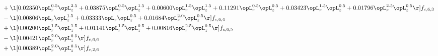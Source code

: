 \begin{alignat}{2}
& + \l[  0.02350 \opL_r^{0.5} \opL_z^{2.5} +  0.03875 \opL_r^{0.5} \opL_z^{1.5} +  0.00600 \opL_r^{1.5} \opL_z^{1.5} +  0.11291 \opL_r^{0.5} \opL_z^{0.5} +  0.03423 \opL_r^{1.5} \opL_z^{0.5} +  0.01796 \opL_r^{2.5} \opL_z^{0.5}  \r] f_{c,6,3} \nonumber \\ 
& - \l[  0.00806 \opL_r \opL_z^{1.5} +  0.03333 \opL_r \opL_z^{0.5} +  0.01684 \opL_r^{2.0} \opL_z^{0.5}  \r] f_{c,6,4} \nonumber \\ 
& + \l[  0.00200 \opL_r^{1.5} \opL_z^{1.5} +  0.01141 \opL_r^{1.5} \opL_z^{0.5} +  0.00816 \opL_r^{2.5} \opL_z^{0.5}  \r] f_{c,6,5} \nonumber \\ 
& - \l[  0.00421 \opL_r^{2.0} \opL_z^{0.5}  \r] f_{c,6,6} \nonumber \\ 
& + \l[  0.00389 \opL_r^{2.0} \opL_z^{0.5}  \r] f_{c,2,6} \nonumber \\ 
\end{alignat} 


